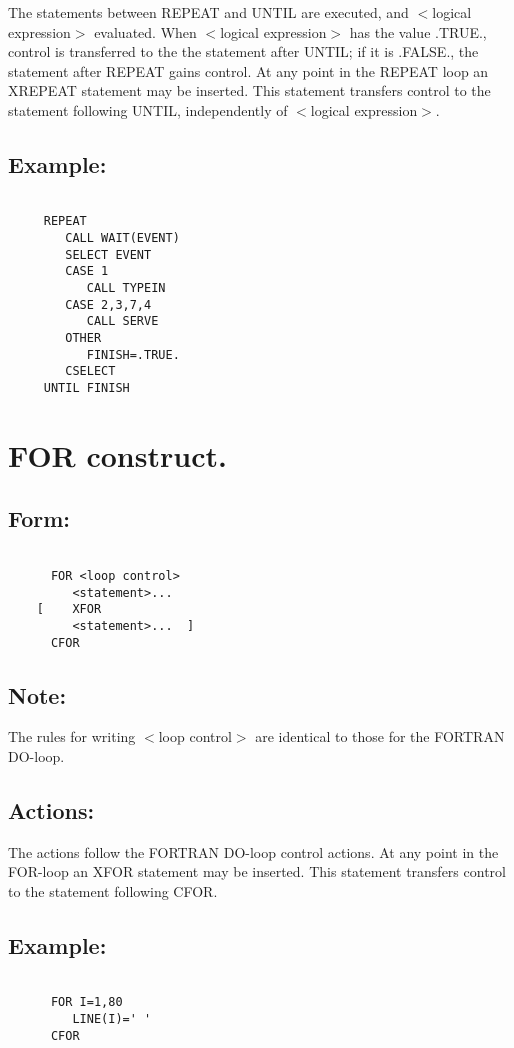 The statements between REPEAT and UNTIL are executed, and $<$logical
expression$>$ evaluated.  When $<$logical expression$>$ has the value
.TRUE., control is transferred to the the statement after UNTIL; if it
is .FALSE., the statement after REPEAT gains control.  At any point in
the REPEAT loop an XREPEAT statement may be inserted.  This statement
transfers control to the statement following UNTIL, independently of
$<$logical expression$>$. 

\subsection{Example:}
\begin{verbatim}

     REPEAT
        CALL WAIT(EVENT)
        SELECT EVENT
        CASE 1
           CALL TYPEIN 
        CASE 2,3,7,4
           CALL SERVE
        OTHER 
           FINISH=.TRUE. 
        CSELECT 
     UNTIL FINISH

\end{verbatim}
\section{FOR construct.}
\subsection{Form:}
\begin{verbatim}

      FOR <loop control>
         <statement>...
    [    XFOR 
         <statement>...  ] 
      CFOR 

\end{verbatim}
\subsection{Note:}

The rules for writing $<$loop control$>$ are identical to those for the
FORTRAN DO-loop. 

\subsection{Actions:}

The actions follow the FORTRAN DO-loop control actions.  At any point in
the FOR-loop an XFOR statement may be inserted.  This statement
transfers control to the statement following CFOR. 

\subsection{Example:}
\begin{verbatim}
 
      FOR I=1,80
         LINE(I)=' ' 
      CFOR

\end{verbatim}
